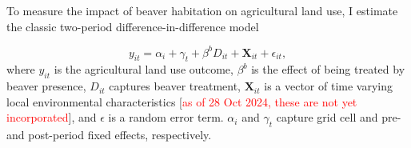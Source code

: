 
To measure the impact of beaver habitation on agricultural land use, I estimate the classic two-period difference-in-difference model

\begin{equation} \label{eq:main_beaver_eq}
y_{it} = \alpha_i + \gamma_t + \beta^{b}D_{it} + \mathbf{X}_{it} + \epsilon_{it},
\end{equation}
where $y_{it}$ is the agricultural land use outcome, $\beta^b$ is the effect of being treated by beaver presence, $D_{it}$ captures beaver treatment, $\mathbf{X}_{it}$ is a vector of time varying local environmental characteristics [\textcolor{red}{as of 28 Oct 2024, these are not yet incorporated}], and $\epsilon$ is a random error term. $\alpha_i$ and $\gamma_t$ capture grid cell and pre-and post-period fixed effects, respectively. 